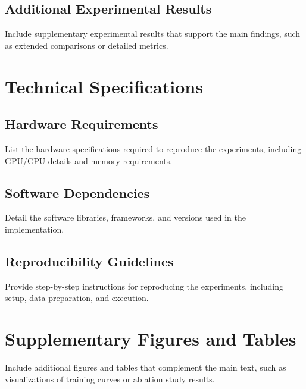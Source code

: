 \documentclass[
	english,
	ruledheaders=section,
	class=report,
	thesis={type=master},
	accentcolor=9c,
	custommargins=true,
	marginpar=false,
	parskip=half-,
	fontsize=11pt,
]{tudapub}
\begin{document}
\section{Additional Experimental Results}
\label{app:additional_results}
Include supplementary experimental results that support the main findings, such as extended comparisons or detailed metrics.

\chapter{Technical Specifications}
\label{app:technical_specs}

\section{Hardware Requirements}
\label{app:hardware_requirements}
List the hardware specifications required to reproduce the experiments, including GPU/CPU details and memory requirements.

\section{Software Dependencies}
\label{app:software_dependencies}
Detail the software libraries, frameworks, and versions used in the implementation.

\section{Reproducibility Guidelines}
\label{app:reproducibility}
Provide step-by-step instructions for reproducing the experiments, including setup, data preparation, and execution.

\chapter{Supplementary Figures and Tables}
Include additional figures and tables that complement the main text, such as
visualizations of training curves or ablation study results.
\label{app:supplementary}
\end{document}
